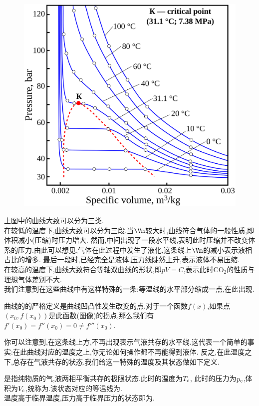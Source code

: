 \documentclass{ctexart}
\begin{document}
\begin{figure}[H]
    \centering\includegraphics[scale=0.2]{picture/realCO2p-V.eps}
\end{figure}
上图中的曲线大致可以分为三类.\\
\indent 在较低的温度下,曲线大致可以分为三段.当$\Vm$较大时,曲线符合气体的一般性质,即体积减小(压缩)时压力增大.%
然而,中间出现了一段水平线,表明此时压缩并不改变体系的压力.由此可以想见,气体在此过程中发生了液化,这条线上$\Vm$的减小表示液相占比的增多.%
最后一段时,已经完全是液体,压力线陡然上升,表示液体不易压缩.\\
\indent 在较高的温度下,曲线大致符合等轴双曲线的形状,即$pV=C$,表示此时$\text{CO}_2$的性质与理想气体差别不大.\\
\indent 我们注意到在这些曲线中有这样特殊的一条:等温线的水平部分缩成一点,在此出现.
\begin{hint}
    曲线的的严格定义是曲线凹凸性发生改变的点.对于一个函数$f(x)$,如果点$\left(x_0,f\left(x_0\right)\right)$是此函数(图像)的拐点,那么我们有%
    $f'\left(x_0\right)=f''\left(x_0\right)=0\neq f'''\left(x_0\right)$.
\end{hint}
你可以注意到,在这条线上方,不再出现表示气液共存的水平线.这代表一个简单的事实:在此曲线对应的温度之上,你无论如何操作都不再能得到液体.%
反之,在此温度之下,总存在气液共存的状态.我们给这一特殊的温度及其状态做如下定义.
\begin{definition}[1C.1.3 临界态与超临界态]
    是指纯物质的气,液两相平衡共存的极限状态.此时的温度为$T_\text c$,%
    此时的压力为$p_\text c$,体积为$V_\text c$,统称为.该状态对应的等温线为.\\
    温度高于临界温度,压力高于临界压力的状态即为.
\end{definition}
\end{document}
